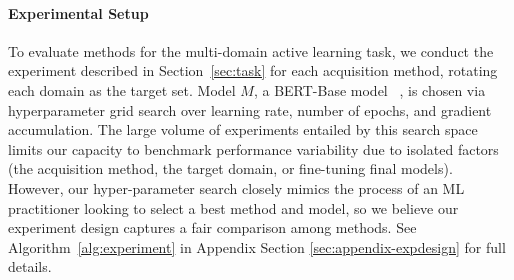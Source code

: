 \respace
\paragraph{Experimental Setup}
\label{sec:ex-setup}
To evaluate methods for the multi-domain active learning task, we conduct the experiment described in Section~\ref{sec:task} for each acquisition method, rotating each domain as the target set.
Model $M$, a BERT-Base model ~\citep{devlin2019bert}, is chosen via hyperparameter grid search over learning rate, number of epochs, and gradient accumulation.
The large volume of experiments entailed by this search space limits our capacity to benchmark performance variability due to isolated factors (the acquisition method, the target domain, or fine-tuning final models).
However, our hyper-parameter search closely mimics the process of an ML practitioner looking to select a best method and model, so we believe our experiment design captures a fair comparison among methods.
See Algorithm~\ref{alg:experiment} in Appendix Section \ref{sec:appendix-expdesign} for full details.



